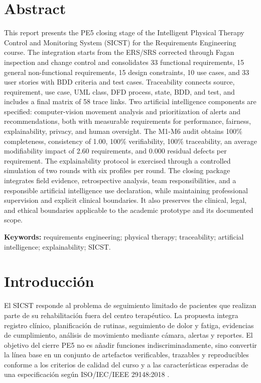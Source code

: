 \documentclass[12pt,a4paper]{article}
\begin{document}
\section*{Abstract}
This report presents the PE5 closing stage of the Intelligent Physical Therapy Control and Monitoring System (SICST) for the Requirements Engineering course. The integration starts from the ERS/SRS corrected through Fagan inspection and change control and consolidates 33 functional requirements, 15 general non-functional requirements, 15 design constraints, 10 use cases, and 33 user stories with BDD criteria and test cases. Traceability connects source, requirement, use case, UML class, DFD process, state, BDD, and test, and includes a final matrix of 58 trace links. Two artificial intelligence components are specified: computer-vision movement analysis and prioritization of alerts and recommendations, both with measurable requirements for performance, fairness, explainability, privacy, and human oversight. The M1-M6 audit obtains 100\% completeness, consistency of 1.00, 100\% verifiability, 100\% traceability, an average modifiability impact of 2.60 requirements, and 0.000 residual defects per requirement. The explainability protocol is exercised through a controlled simulation of two rounds with six profiles per round. The closing package integrates field evidence, retrospective analysis, team responsibilities, and a responsible artificial intelligence use declaration, while maintaining professional supervision and explicit clinical boundaries. It also preserves the clinical, legal, and ethical boundaries applicable to the academic prototype and its documented scope.

\textbf{Keywords:} requirements engineering; physical therapy; traceability; artificial intelligence; explainability; SICST.

\clearpage
\tableofcontents
\clearpage
\listoftables
\clearpage
\listoffigures
\clearpage

\section{Introducción}
El SICST responde al problema de seguimiento limitado de pacientes que realizan parte de su rehabilitación fuera del centro terapéutico. La propuesta integra registro clínico, planificación de rutinas, seguimiento de dolor y fatiga, evidencias de cumplimiento, análisis de movimiento mediante cámara, alertas y reportes. El objetivo del cierre PE5 no es añadir funciones indiscriminadamente, sino convertir la línea base en un conjunto de artefactos verificables, trazables y reproducibles conforme a los criterios de calidad del curso y a las características esperadas de una especificación según ISO/IEC/IEEE 29148:2018 \cite{iso29148}.
\end{document}
